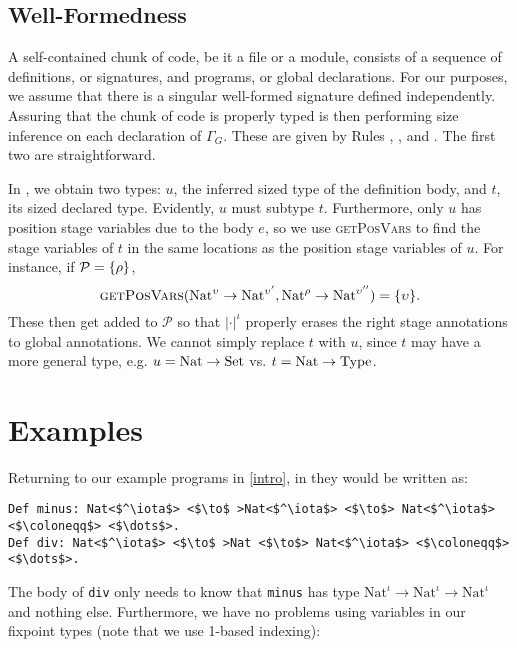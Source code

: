\documentclass[sigplan,10pt,anonymous,review]{acmart}
\begin{document}
\subsection{Well-Formedness}

A self-contained chunk of code, be it a file or a module, consists of a sequence of \coinductive definitions, or signatures, and programs, or global declarations. For our purposes, we assume that there is a singular well-formed signature defined independently. Assuring that the chunk of code is properly typed is then performing size inference on each declaration of $\Gamma_G$. These are given by Rules , , and . The first two are straightforward.

In , we obtain two types: $u$, the inferred sized type of the definition body, and $t$, its sized declared type. Evidently, $u$ must subtype $t$. Furthermore, only $u$ has position stage variables due to the body $e$, so we use \textsc{getPosVars} to find the stage variables of $t$ in the same locations as the position stage variables of $u$. For instance, if $\mathcal{P} = \{\rho\}$, $$\textsc{getPosVars}(\text{Nat}^\upsilon \to \text{Nat}^{\upsilon'}, \text{Nat}^\rho \to \text{Nat}^{\upsilon''}) = \{\upsilon\}.$$ These then get added to $\mathcal{P}$ so that $|\cdot|^\iota$ properly erases the right stage annotations to global annotations. We cannot simply replace $t$ with $u$, since $t$ may have a more general type, e.g. $u = \text{Nat} \to \text{Set}$ vs. $t = \text{Nat} \to \text{Type}_{}$.

\section{Examples}\label{examples}

Returning to our example programs in \autoref{intro}, in \lang they would be written as:

\begin{verbatim}
Def minus: Nat<$^\iota$> <$\to$ >Nat<$^\iota$> <$\to$> Nat<$^\iota$> <$\coloneqq$> <$\dots$>.
Def div: Nat<$^\iota$> <$\to$ >Nat <$\to$> Nat<$^\iota$> <$\coloneqq$> <$\dots$>.
\end{verbatim}

The body of \texttt{div} only needs to know that \texttt{minus} has type $\text{Nat}^\iota \to \text{Nat}^\iota \to \text{Nat}^\iota$ and nothing else. Furthermore, we have no problems using variables in our fixpoint types (note that we use 1-based indexing):
\end{document}
